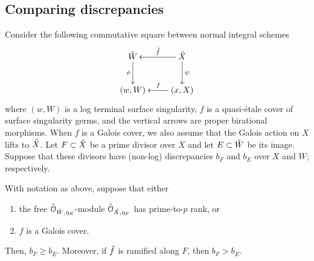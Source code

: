 \documentclass[12pt]{amsart}
\theoremstyle{plain}   %
\theoremstyle{definition}    %
\theoremstyle{remark}    %
\numberwithin{equation}{theorem}
\newcommand{\sO}{\mathcal{O}}
\begin{document}
\subsection{Comparing discrepancies}
Consider the following commutative square between normal integral schemes
\[
\xymatrix{
\Tilde{W} \ar[d]_-{\phi} & \Tilde{X} \ar[d]^-{\psi} \ar[l]_-{\Tilde{f}} \\
(w,W) & \ar[l]_-{f} (x,X)
}
\]
where $(w,W)$ is a log terminal surface singularity, $f$ is a quasi-\'etale cover of surface singularity germs, and the vertical arrows are proper birational morphisms. When $f$ is a Galois cover, we also assume that the Galois action on $X$ lifts to $\Tilde{X}$.
Let $F\subset \Tilde{X}$ be a prime divisor over $X$ and let $E\subset \Tilde{W}$ be its image. Suppose that these divisors have (non-log) discrepancies $b_F$ and $b_E$ over $X$ and $W$; respectively. 

\begin{proposition}\label{prop:compare-discreps}
With notation as above, suppose that either 
    \begin{enumerate}
        \item the free $\Hat{\sO}_{\Tilde{W},\eta_E}$-module $\Hat{\sO}_{\Tilde{X},\eta_F}$ has prime-to-$p$ rank, or
        \item $f$ is a Galois cover.
    \end{enumerate}
Then, $b_F\ge b_E$. Moreover, if $\Tilde{f}$ is ramified along $F$, then $b_F > b_E$. 
\end{proposition}
\end{document}
